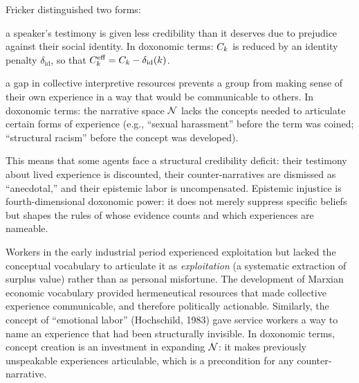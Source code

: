 Fricker distinguished two forms:

\begin{definition}
\label{def:epistemic-injustice-forms}
\begin{description}[nosep]
  \item[Testimonial injustice:] a speaker's testimony is given less credibility than it deserves due to prejudice against their social identity.
  In doxonomic terms: $C_{k}$ is reduced by an identity penalty $\delta_{\text{id}}$, so that $C_{k}^{\text{eff}} = C_{k} - \delta_{\text{id}}(k)$.
  \item[Hermeneutical injustice:] a gap in collective interpretive resources prevents a group from making sense of their own experience in a way that would be communicable to others.
  In doxonomic terms: the narrative space $\mathcal{N}$ lacks the concepts needed to articulate certain forms of experience (e.g., ``sexual harassment'' before the term was coined; ``structural racism'' before the concept was developed).
\end{description}
\end{definition}

This means that some agents face a structural credibility deficit: their testimony about lived experience is discounted, their counter-narratives are dismissed as ``anecdotal,'' and their epistemic labor is uncompensated.
Epistemic injustice is fourth-dimensional doxonomic power: it does not merely suppress specific beliefs but shapes the rules of whose evidence counts and which experiences are nameable.

\begin{example}
\label{ex:hermeneutical}
Workers in the early industrial period experienced exploitation but lacked the conceptual vocabulary to articulate it as \emph{exploitation} (a systematic extraction of surplus value) rather than as personal misfortune.
The development of Marxian economic vocabulary provided hermeneutical resources that made collective experience communicable, and therefore politically actionable.
Similarly, the concept of ``emotional labor'' (Hochschild, 1983) gave service workers a way to name an experience that had been structurally invisible.
In doxonomic terms, concept creation is an investment in expanding $\mathcal{N}$: it makes previously unspeakable experiences articulable, which is a precondition for any counter-narrative.
\end{example}


